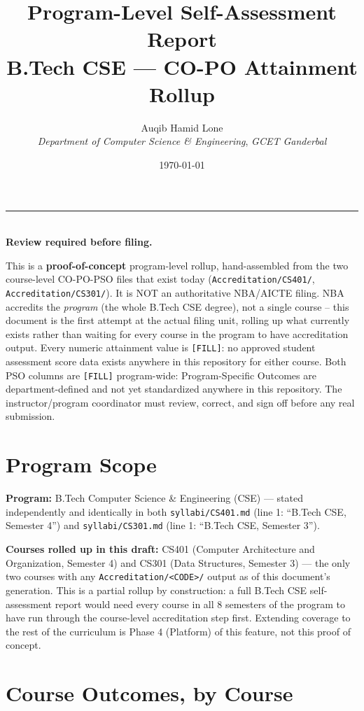 \documentclass[11pt]{article}
\title{Program-Level Self-Assessment Report\\\large B.Tech CSE --- CO-PO Attainment Rollup}
\author{Auqib Hamid Lone\\[0.3em]
  \emph{Department of Computer Science \& Engineering}, \emph{GCET Ganderbal}}
\date{\today}
\newenvironment{noticebox}{%
  \par\noindent\begin{minipage}{\linewidth}\vspace{0.4em}
  \textcolor{negative}{\rule{\linewidth}{1.2pt}}\\[0.3em]
  \textbf{\textcolor{negative}{Review required before filing.}}\ \itshape
}{%
  \end{minipage}\vspace{0.6em}\par
}
\begin{document}
\maketitle

\begin{noticebox}
This is a \textbf{proof-of-concept} program-level rollup, hand-assembled from the two course-level CO-PO-PSO files that exist today (\texttt{Accreditation/CS401/}, \texttt{Accreditation/CS301/}). It is NOT an authoritative NBA/AICTE filing. NBA accredits the \emph{program} (the whole B.Tech CSE degree), not a single course -- this document is the first attempt at the actual filing unit, rolling up what currently exists rather than waiting for every course in the program to have accreditation output. Every numeric attainment value is \texttt{[FILL]}: no approved student assessment score data exists anywhere in this repository for either course. Both PSO columns are \texttt{[FILL]} program-wide: Program-Specific Outcomes are department-defined and not yet standardized anywhere in this repository. The instructor/program coordinator must review, correct, and sign off before any real submission.
\end{noticebox}

\section{Program Scope}

\textbf{Program:} B.Tech Computer Science \& Engineering (CSE) --- stated independently and identically in both \texttt{syllabi/CS401.md} (line 1: ``B.Tech CSE, Semester 4'') and \texttt{syllabi/CS301.md} (line 1: ``B.Tech CSE, Semester 3'').

\textbf{Courses rolled up in this draft:} CS401 (Computer Architecture and Organization, Semester 4) and CS301 (Data Structures, Semester 3) --- the only two courses with any \texttt{Accreditation/<CODE>/} output as of this document's generation. This is a partial rollup by construction: a full B.Tech CSE self-assessment report would need every course in all 8 semesters of the program to have run through the course-level accreditation step first. Extending coverage to the rest of the curriculum is Phase 4 (Platform) of this feature, not this proof of concept.

\section{Course Outcomes, by Course}
\end{document}

